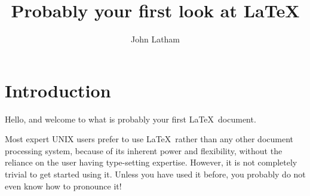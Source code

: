 \documentclass[12pt,a4paper]{article}
\title{Probably your first look at \LaTeX}
\author{John Latham}
\begin{document}

\maketitle


\tableofcontents




\section{Introduction}



Hello, and welcome to what is probably your first \LaTeX\ document.

Most expert UNIX users prefer to use \LaTeX\ rather than any other document
processing system, because of its inherent power and flexibility, without the
reliance on the user having type-setting expertise. However, it is not
completely trivial to get started using it. Unless you have used it before,
you probably do not even know how to pronounce it!
\end{document}
